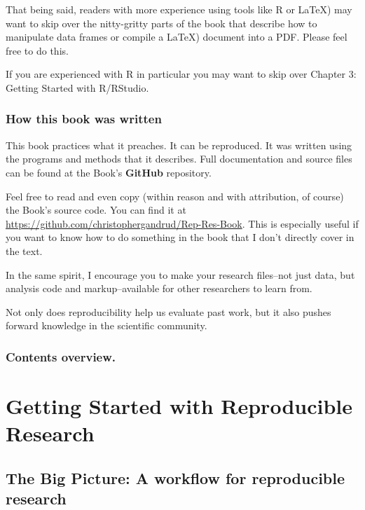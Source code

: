\documentclass[ChapterTOCs,krantz1]{krantz}\usepackage{graphicx, color}
\begin{document}
That being said, readers with more experience using tools like
R or \LaTeX) may want to
skip over the nitty-gritty parts of the book that describe how to
manipulate data frames or compile a \LaTeX) document into a PDF. Please feel free to do
this.

If you are experienced with R in particular you may want to
skip over Chapter 3: Getting Started with R/RStudio.

\subsection{How this book was written}

This book practices what it preaches. It can be reproduced. It was
written using the programs and methods that it describes. Full
documentation and source files can be found at the Book's
\textbf{GitHub} repository.

Feel free to read and even copy (within reason and with attribution, of
course) the Book's source code. You can find it at
\url{https://github.com/christophergandrud/Rep-Res-Book}. This is
especially useful if you want to know how to do something in the book
that I don't directly cover in the text.

In the same spirit, I encourage you to make your research files--not
just data, but analysis code and markup--available for other researchers
to learn from.

Not only does reproducibility help us evaluate past work, but it also
pushes forward knowledge in the scientific community.

\subsection{Contents overview.}





\chapter{Getting Started with Reproducible Research}

\section{The Big Picture: A workflow for reproducible research}
\end{document}
